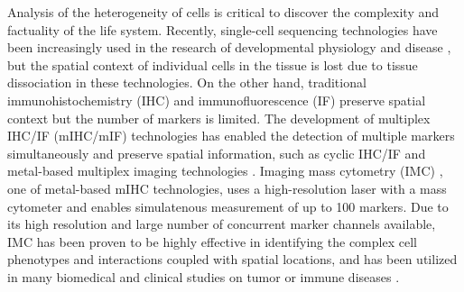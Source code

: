 \documentclass{mynature}
\begin{document}
Analysis of the heterogeneity of cells is critical to discover the complexity and factuality of the life system. Recently, single-cell sequencing technologies have been increasingly used in the research of developmental physiology and disease \cite{lahnemann2020single, stubbington2017single, potter2018single, papalexi2018single}, but the spatial context of individual cells in the tissue is lost due to tissue dissociation in these technologies. 
On the other hand, traditional immunohistochemistry (IHC) and immunofluorescence (IF) preserve spatial context but the number of markers is limited. 
The development of multiplex IHC/IF (mIHC/mIF) technologies has enabled the detection of multiple markers simultaneously and preserve spatial information, such as cyclic IHC/IF and metal-based multiplex imaging technologies \cite{mIHC2020overview, giesen2014IMC, zrazhevskiy2013cyclicIHC, angelo2014MIBI}. Imaging mass cytometry (IMC) \cite{giesen2014IMC, chang2017IMC}, one of metal-based mIHC technologies, uses a high-resolution laser with a mass cytometer and enables simulatenous measurement of up to 100 markers.
Due to its high resolution and large number of concurrent marker channels available, IMC has been proven to be highly effective in identifying the complex cell phenotypes and interactions coupled with spatial locations, and has been utilized in many biomedical and clinical studies on tumor or immune diseases \cite{giesen2014IMC, damond2019T1D, wang2019T1D, ramaglia2019sclerosis, bottcher2020sclerosis, de2020unraveling, brahler2018opposingGN, aoki2020single, jackson2020BRCA, Ali2020, dey2020oncogenic, zhang2020inflammatory, bengsch2020deep}. 
\end{document}
